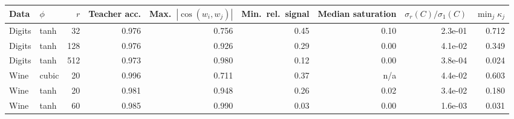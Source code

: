 \begin{tabular}{l l r r r r r r r}
\toprule
Data & $\phi$ & $r$ & Teacher acc. & Max.\ $|\cos(w_i,w_j)|$ & Min.\ rel.\ signal & Median saturation & $\sigma_r(C)/\sigma_1(C)$ & $\min_j\kappa_j$\\
\midrule
Digits & tanh & 32 & 0.976 & 0.756 & 0.45 & 0.10 & 2.3e-01 & 0.712 \\
Digits & tanh & 128 & 0.976 & 0.926 & 0.29 & 0.00 & 4.1e-02 & 0.349 \\
Digits & tanh & 512 & 0.973 & 0.980 & 0.12 & 0.00 & 3.8e-04 & 0.024 \\
Wine & cubic & 20 & 0.996 & 0.711 & 0.37 & n/a & 4.4e-02 & 0.603 \\
Wine & tanh & 20 & 0.981 & 0.948 & 0.26 & 0.02 & 3.4e-02 & 0.180 \\
Wine & tanh & 60 & 0.985 & 0.990 & 0.03 & 0.00 & 1.6e-03 & 0.031 \\
\bottomrule
\end{tabular}
